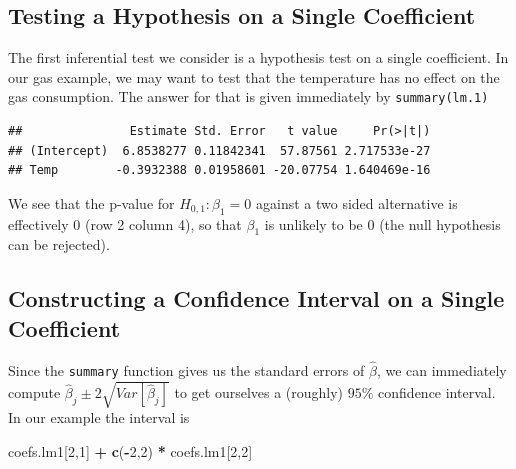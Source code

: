 \documentclass[]{book}
\newenvironment{Shaded}{\begin{snugshade}}{\end{snugshade}}
\newcommand{\DecValTok}[1]{\textcolor[rgb]{0.00,0.00,0.81}{#1}}
\newcommand{\FloatTok}[1]{\textcolor[rgb]{0.00,0.00,0.81}{#1}}
\newcommand{\KeywordTok}[1]{\textcolor[rgb]{0.13,0.29,0.53}{\textbf{#1}}}
\newcommand{\NormalTok}[1]{#1}
\newcommand{\OperatorTok}[1]{\textcolor[rgb]{0.81,0.36,0.00}{\textbf{#1}}}
\newcommand{\StringTok}[1]{\textcolor[rgb]{0.31,0.60,0.02}{#1}}
\theoremstyle{definition}
\theoremstyle{definition}
\theoremstyle{definition}
\theoremstyle{remark}
\begin{document}
\hypertarget{testing-a-hypothesis-on-a-single-coefficient}{%
\subsection{Testing a Hypothesis on a Single Coefficient}\label{testing-a-hypothesis-on-a-single-coefficient}}

The first inferential test we consider is a hypothesis test on a single coefficient.
In our gas example, we may want to test that the temperature has no effect on the gas consumption.
The answer for that is given immediately by \texttt{summary(lm.1)}

\begin{Shaded}
\end{Shaded}

\begin{verbatim}
##               Estimate Std. Error   t value     Pr(>|t|)
## (Intercept)  6.8538277 0.11842341  57.87561 2.717533e-27
## Temp        -0.3932388 0.01958601 -20.07754 1.640469e-16
\end{verbatim}

We see that the p-value for \(H_{0,1}: \beta_1=0\) against a two sided alternative is effectively 0 (row 2 column 4), so that \(\beta_1\) is unlikely to be \(0\) (the null hypothesis can be rejected).

\hypertarget{constructing-a-confidence-interval-on-a-single-coefficient}{%
\subsection{Constructing a Confidence Interval on a Single Coefficient}\label{constructing-a-confidence-interval-on-a-single-coefficient}}

Since the \texttt{summary} function gives us the standard errors of \(\hat \beta\), we can immediately compute \(\hat \beta_j \pm 2 \sqrt{Var[\hat \beta_j]}\) to get ourselves a (roughly) \(95\%\) confidence interval.
In our example the interval is

\begin{Shaded}
\begin{Highlighting}[]
\NormalTok{coefs.lm1[}\DecValTok{2}\NormalTok{,}\DecValTok{1}\NormalTok{] }\OperatorTok{+}\StringTok{ }\KeywordTok{c}\NormalTok{(}\OperatorTok{-}\DecValTok{2}\NormalTok{,}\DecValTok{2}\NormalTok{) }\OperatorTok{*}\StringTok{ }\NormalTok{coefs.lm1[}\DecValTok{2}\NormalTok{,}\DecValTok{2}\NormalTok{]}
\end{Highlighting}
\end{Shaded}
\end{document}
